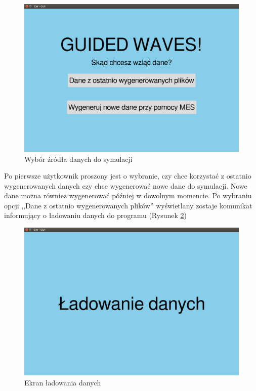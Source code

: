 \begin{figure}[h]
\centering
\includegraphics[width=13cm]{Zdjecia/5/kasia/gui1}
\caption{Wybór źródła danych do symulacji}
\label{fig:gui1}
\end{figure}

Po pierwsze użytkownik proszony jest o wybranie, czy chce korzystać z ostatnio wygenerowanych danych czy chce wygenerować nowe dane do symulacji. Nowe dane można również wygenerować później w dowolnym momencie. Po wybraniu opcji ,,Dane z ostatnio wygenerowanych plików'' wyświetlany zostaje komunikat informujący o ładowaniu danych do programu (Rysunek \ref{fig:gui2})

\begin{figure}[h]
\centering
\includegraphics[width=13cm]{Zdjecia/5/kasia/gui2}
\caption{Ekran ładowania danych}
\label{fig:gui2}
\end{figure}

